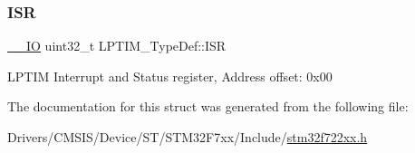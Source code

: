 \subsubsection{\texorpdfstring{ISR}{ISR}}
{\footnotesize\ttfamily \mbox{\hyperlink{core__sc300_8h_aec43007d9998a0a0e01faede4133d6be}{\+\_\+\+\_\+\+IO}} uint32\+\_\+t L\+P\+T\+I\+M\+\_\+\+Type\+Def\+::\+I\+SR}

L\+P\+T\+IM Interrupt and Status register, Address offset\+: 0x00 

The documentation for this struct was generated from the following file\+:\begin{DoxyCompactItemize}
\item 
Drivers/\+C\+M\+S\+I\+S/\+Device/\+S\+T/\+S\+T\+M32\+F7xx/\+Include/\mbox{\hyperlink{stm32f722xx_8h}{stm32f722xx.\+h}}\end{DoxyCompactItemize}

